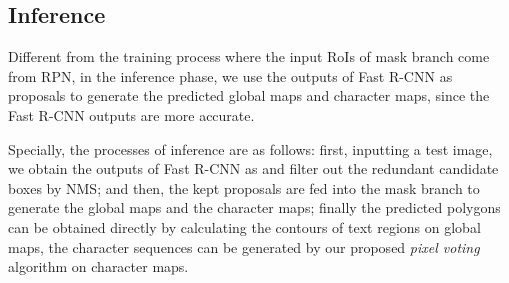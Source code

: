 \documentclass[runningheads]{llncs}
\begin{document}
\subsection{Inference}

Different from the training process where the input RoIs of mask branch come from RPN, in the inference phase, we use the outputs of Fast R-CNN as proposals to generate the predicted global maps and character maps, since the Fast R-CNN outputs are more accurate. 

Specially, the processes of inference are as follows: first, inputting a test image, we obtain the outputs of Fast R-CNN as \cite{ren2015faster} and filter out the redundant candidate boxes by NMS; and then, the kept proposals are fed into the mask branch to generate the global maps and the character maps; finally the predicted polygons can be obtained directly by calculating the contours of text regions on global maps, the character sequences can be generated by our proposed \textit{pixel voting} algorithm on character maps.


    
\end{document}
